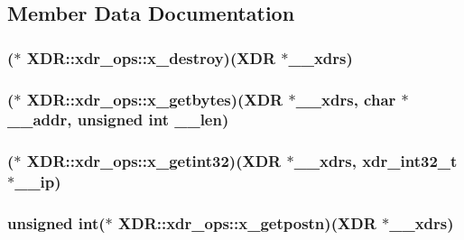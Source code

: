 \subsection{\-Member \-Data \-Documentation}
\hypertarget{structXDR_1_1xdr__ops_a798f4f4e8cf97ff6c1513fa4c186891f}{
\subsubsection[{x\-\_\-destroy}]{($\ast$ {\bf \-X\-D\-R\-::xdr\-\_\-ops\-::x\-\_\-destroy})({\bf \-X\-D\-R} $\ast$\-\_\-\-\_\-xdrs)}}\label{structXDR_1_1xdr__ops_a798f4f4e8cf97ff6c1513fa4c186891f}
\hypertarget{structXDR_1_1xdr__ops_a1a420c3b5a54bc2f1acae91536c965fb}{
\subsubsection[{x\-\_\-getbytes}]{($\ast$ {\bf \-X\-D\-R\-::xdr\-\_\-ops\-::x\-\_\-getbytes})({\bf \-X\-D\-R} $\ast$\-\_\-\-\_\-xdrs, char $\ast$\-\_\-\-\_\-addr, unsigned int \-\_\-\-\_\-len)}}\label{structXDR_1_1xdr__ops_a1a420c3b5a54bc2f1acae91536c965fb}
\hypertarget{structXDR_1_1xdr__ops_a65ab539fa63638deb283b6c3322c1829}{
\subsubsection[{x\-\_\-getint32}]{($\ast$ {\bf \-X\-D\-R\-::xdr\-\_\-ops\-::x\-\_\-getint32})({\bf \-X\-D\-R} $\ast$\-\_\-\-\_\-xdrs, xdr\-\_\-int32\-\_\-t $\ast$\-\_\-\-\_\-ip)}}\label{structXDR_1_1xdr__ops_a65ab539fa63638deb283b6c3322c1829}
\hypertarget{structXDR_1_1xdr__ops_aa8ba298e4969165845e4ddb483460f12}{
\subsubsection[{x\-\_\-getpostn}]{\setlength{\rightskip}{0pt plus 5cm}unsigned int($\ast$ {\bf \-X\-D\-R\-::xdr\-\_\-ops\-::x\-\_\-getpostn})({\bf \-X\-D\-R} $\ast$\-\_\-\-\_\-xdrs)}}\label{structXDR_1_1xdr__ops_aa8ba298e4969165845e4ddb483460f12}
